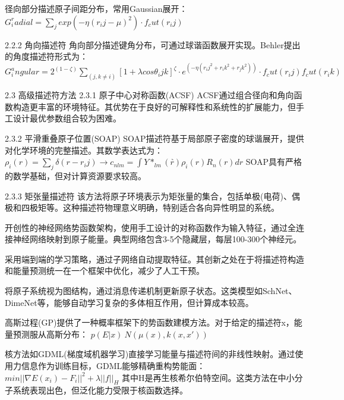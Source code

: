 径向部分描述原子间距分布，常用\textrm{Gaussian}展开：
$G_i^radial = ∑_j exp(-η(r_ij - μ)^2) · f_cut(r_ij)$

 2.2.2 角向描述符
角向部分描述键角分布，可通过球谐函数展开实现。Behler提出的角度描述符形式为：
$G_i^angular = 2^(1-ζ) ∑_(j,k≠i) [1+λcosθ_ijk]^ζ · e^(-η(r_ij^2+r_ik^2+r_jk^2)) · f_cut(r_ij)f_cut(r_ik)$

 2.3 高级描述符方法
 2.3.1 原子中心对称函数(ACSF)
ACSF通过组合径向和角向函数构造更丰富的环境特征。其优势在于良好的可解释性和系统性的扩展能力，但手工设计最优参数组合较为困难。

 2.3.2 平滑重叠原子位置(SOAP)
SOAP描述符基于局部原子密度的球谐展开，提供对化学环境的完整描述。其数学表达式为：
$ρ_i(r) = ∑_j δ(r - r_ij) → c_{nlm} = ∫Y*_{lm}(r̂)ρ_i(r)R_n(r)dr$
SOAP具有严格的数学基础，但对计算资源要求较高。

 2.3.3 矩张量描述符
该方法将原子环境表示为矩张量的集合，包括单极(电荷)、偶极和四极矩等。这种描述符物理意义明确，特别适合各向异性明显的系统。


开创性的神经网络势函数架构，使用手工设计的对称函数作为输入特征，通过全连接神经网络映射到原子能量。典型网络包含3-5个隐藏层，每层100-300个神经元。

采用端到端的学习策略，通过子网络自动提取特征。其创新之处在于将描述符构造和能量预测统一在一个框架中优化，减少了人工干预。

将原子系统视为图结构，通过消息传递机制更新原子状态。这类模型如SchNet、DimeNet等，能够自动学习复杂的多体相互作用，但计算成本较高。

高斯过程(GP)提供了一种概率框架下的势函数建模方法。对于给定的描述符x，能量预测服从高斯分布：
$p(E|x) ~ N(μ(x), k(x,x'))$

核方法如GDML(梯度域机器学习)直接学习能量与描述符间的非线性映射。通过使用力信息作为训练目标，GDML能够精确重构势能面：
$min ||∇E(x_i) - F_i||^2 + λ||f||_H$
其中H是再生核希尔伯特空间。这类方法在中小分子系统表现出色，但泛化能力受限于核函数选择。


